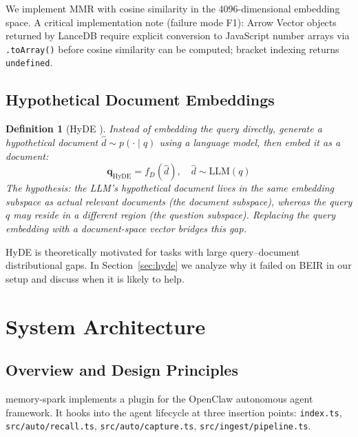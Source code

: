 \documentclass[11pt]{article}
\newtheorem{definition}{Definition}
\begin{document}
We implement MMR with cosine similarity in the 4096-dimensional embedding space.
A critical implementation note (failure mode F1): Arrow Vector objects returned by
LanceDB require explicit conversion to JavaScript number arrays via \texttt{.toArray()}
before cosine similarity can be computed; bracket indexing returns \texttt{undefined}.

\subsection{Hypothetical Document Embeddings}

\begin{definition}[HyDE \citep{gao2023hyde}]
Instead of embedding the query directly, generate a hypothetical document
$\hat{d} \sim p(\cdot \mid q)$ using a language model, then embed it as a document:
\begin{equation}
  \mathbf{q}_{\text{HyDE}} = f_D(\hat{d}), \quad \hat{d} \sim \text{LLM}(q)
\end{equation}
The hypothesis: the LLM's hypothetical document lives in the same embedding subspace
as actual relevant documents (the document subspace), whereas the query $q$ may reside
in a different region (the question subspace). Replacing the query embedding with a
document-space vector bridges this gap.
\end{definition}

HyDE is theoretically motivated for tasks with large query--document distributional
gaps. In Section~\ref{sec:hyde} we analyze why it failed on BEIR in our setup and
discuss when it is likely to help.

\section{System Architecture}
\label{sec:arch}

\subsection{Overview and Design Principles}

memory-spark implements a plugin for the OpenClaw autonomous agent framework. It hooks
into the agent lifecycle at three insertion points:
\texttt{index.ts}, \texttt{src/auto/recall.ts}, \texttt{src/auto/capture.ts}, \texttt{src/ingest/pipeline.ts}.
\end{document}
